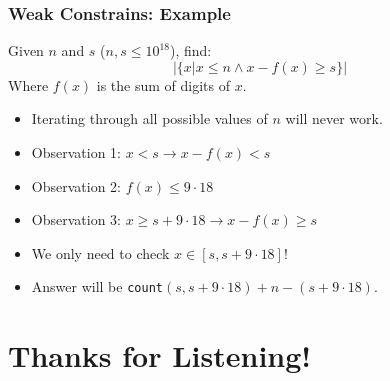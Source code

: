 \documentclass{beamer}
\begin{document}
\begin{frame}
	\frametitle{Weak Constrains: Example}

	Given $n$ and $s$ ($n,s \leq 10^{18}$), find:
	$$|\{x | x \leq n \wedge x - f(x) \geq s\}|$$
	Where $f(x)$ is the sum of digits of $x$.

	\begin{itemize}
		\item Iterating through all possible values of $n$ will never work.
		\item<2-> Observation 1: $x < s \rightarrow x - f(x) < s$
		\item<3-> Observation 2: $f(x) \leq 9 \cdot 18$
		\item<4-> Observation 3: $x \geq s + 9 \cdot 18 \rightarrow x - f(x) \geq s$
		\item<5-> We only need to check $x \in [s, s + 9 \cdot 18]$!
		\item<5-> Answer will be \texttt{count}$(s, s + 9 \cdot 18) + n - (s + 9 \cdot 18)$.
	\end{itemize}
\end{frame}

\section{Thanks for Listening!}
\end{document}
